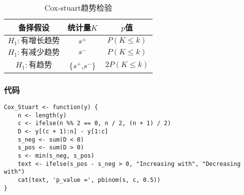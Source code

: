 \begin{table}[htbp]
	\centering
	\begin{tabular}{ccc}
		\toprule
		备择假设 & 统计量$K$ & $p$值 \\
		\midrule 
		$H_1:\text{有增长趋势}$ & $s^+$ & $P(K\leqslant k)$ \\
		$H_1:\text{有减少趋势}$ & $s^-$ & $P(K\leqslant k)$ \\
		$H_1:\text{有趋势}$ & \text{min}\{$s^+$,\;$s^-$\} & $2P(K\leqslant k)$ \\
		\bottomrule 
	\end{tabular}
	\caption{Cox-stuart趋势检验}\label{table:cox-stuart}
\end{table}
\subsubsection{代码}
\begin{verbatim}
Cox_Stuart <- function(y) {
    n <- length(y)
    c <- ifelse(n %% 2 == 0, n / 2, (n + 1) / 2)
    D <- y[(c + 1):n] - y[1:c]
    s_neg <- sum(D < 0)
    s_pos <- sum(D > 0)
    s <- min(s_neg, s_pos)
    text <- ifelse(s_pos - s_neg > 0, "Increasing with", "Decreasing with")
    cat(text, 'p_value =', pbinom(s, c, 0.5))
}
\end{verbatim}

